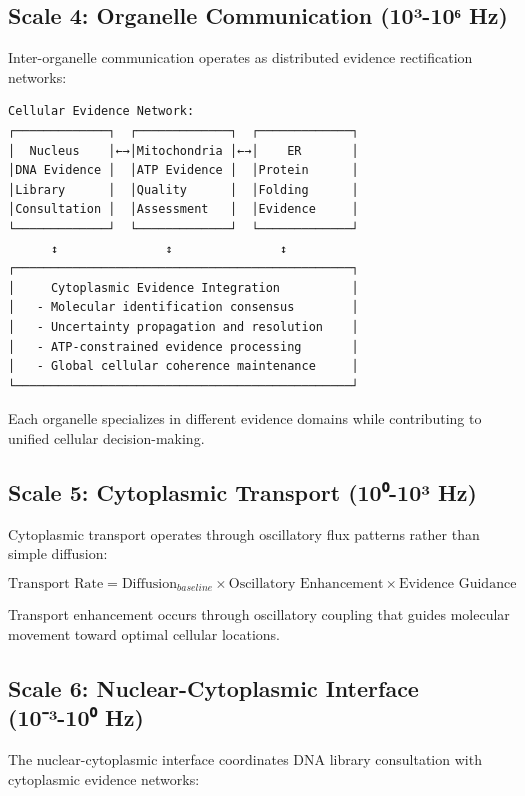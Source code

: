 \documentclass[12pt,a4paper]{article}
\begin{document}
{\subsection{Scale 4: Organelle Communication (10³-10⁶ Hz)}

Inter-organelle communication operates as distributed evidence rectification networks:

\begin{verbatim}
Cellular Evidence Network:
┌─────────────┐  ┌─────────────┐  ┌─────────────┐
│  Nucleus    │←→│Mitochondria │←→│    ER       │
│DNA Evidence │  │ATP Evidence │  │Protein      │
│Library      │  │Quality      │  │Folding      │
│Consultation │  │Assessment   │  │Evidence     │
└─────────────┘  └─────────────┘  └─────────────┘
      ↕               ↕               ↕
┌───────────────────────────────────────────────┐
│     Cytoplasmic Evidence Integration          │
│   - Molecular identification consensus        │
│   - Uncertainty propagation and resolution    │
│   - ATP-constrained evidence processing       │
│   - Global cellular coherence maintenance     │
└───────────────────────────────────────────────┘
\end{verbatim}

Each organelle specializes in different evidence domains while contributing to unified cellular decision-making.

\subsection{Scale 5: Cytoplasmic Transport (10⁰-10³ Hz)}

Cytoplasmic transport operates through oscillatory flux patterns rather than simple diffusion:

\begin{equation}
\text{Transport Rate} = \text{Diffusion}_{baseline} \times \text{Oscillatory Enhancement} \times \text{Evidence Guidance}
\end{equation}

Transport enhancement occurs through oscillatory coupling that guides molecular movement toward optimal cellular locations.

\subsection{Scale 6: Nuclear-Cytoplasmic Interface (10⁻³-10⁰ Hz)}

The nuclear-cytoplasmic interface coordinates DNA library consultation with cytoplasmic evidence networks:

}
\end{document}
